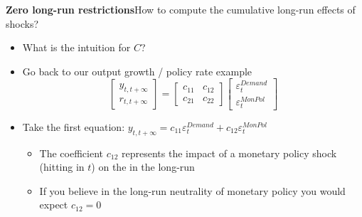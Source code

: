 
\begin{frame}
{\textbf{Zero long-run restrictions}}{How to compute the cumulative long-run
effects of shocks?}\bigskip

\begin{itemize}
\item What is the intuition for $C$?\bigskip

\item Go back to our output growth / policy rate example 
\begin{equation*}
\begin{bmatrix}
y_{t,t+\infty } \\ 
r_{t,t+\infty }%
\end{bmatrix}%
=\left[ 
\begin{array}{cc}
c_{11} & c_{12} \\ 
c_{21} & c_{22}%
\end{array}%
\right] 
\begin{bmatrix}
\varepsilon _{t}^{Demand} \\ 
\varepsilon _{t}^{MonPol}%
\end{bmatrix}%
\end{equation*}%
\pause

\item Take the first equation: $y_{t,t+\infty }=c_{11}\varepsilon
_{t}^{Demand}+c_{12}\varepsilon _{t}^{MonPol}$\smallskip

\begin{itemize}
\item The coefficient $c_{12}$ represents the impact of a monetary policy
shock (hitting in $t$) on the {} in the long-run\medskip 
{}

\item If you believe in the long-run neutrality of monetary policy you would
expect $c_{12}=0$
\end{itemize}
\end{itemize}
\end{frame}



